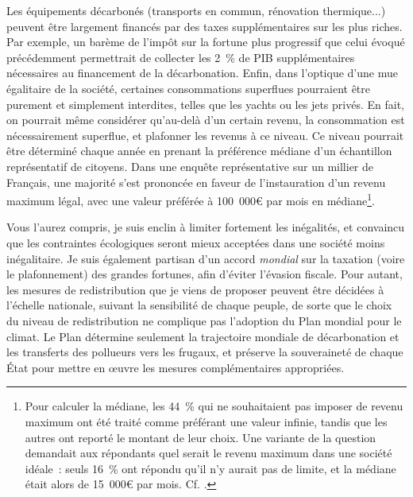 \documentclass[a5paper,french]{memoir}
\begin{document}
Les équipements décarbonés (transports en commun, rénovation thermique...) peuvent être largement financés par des taxes supplémentaires sur les plus riches. Par exemple, un barème de l'impôt sur la fortune plus progressif que celui évoqué précédemment permettrait de collecter les 2~\% de PIB supplémentaires nécessaires au financement de la décarbonation. Enfin, dans l'optique d'une mue égalitaire de la société, certaines consommations superflues pourraient être purement et simplement interdites, telles que les yachts ou les jets privés. En fait, on pourrait même considérer qu'au-delà d'un certain revenu, la consommation est nécessairement superflue, et plafonner les revenus à ce niveau. Ce niveau pourrait être déterminé chaque année en prenant la préférence médiane d'un échantillon représentatif de citoyens. Dans une enquête représentative sur un millier de Français, une majorité s'est prononcée en faveur de l'instauration d'un revenu maximum légal, avec une valeur préférée à 100~000\euro{} par mois en médiane\footnote{Pour calculer la médiane, les 44~\% qui ne souhaitaient pas imposer de revenu maximum ont été traité comme préférant une valeur infinie, tandis que les autres ont reporté le montant de leur choix. Une variante de la question demandait aux répondants quel serait le revenu maximum dans une société idéale~: seuls 16~\% ont répondu qu'il n'y aurait pas de limite, et la médiane était alors de 15~000\euro{} par mois. Cf. \cite{fabre_determiner_2022}.}. 

Vous l'aurez compris, je suis enclin à limiter fortement les inégalités, et convaincu que les contraintes écologiques seront mieux acceptées dans une société moins inégalitaire. Je suis également partisan d'un accord \textit{mondial} sur la taxation (voire le plafonnement) des grandes fortunes, afin d'éviter l'évasion fiscale. Pour autant, les mesures de redistribution que je viens de proposer peuvent être décidées à l'échelle nationale, suivant la sensibilité de chaque peuple, de sorte que le choix du niveau de redistribution ne complique pas l'adoption du Plan mondial pour le climat. Le Plan détermine seulement la trajectoire mondiale de décarbonation et les transferts des pollueurs vers les frugaux, et préserve la souveraineté de chaque État pour mettre en œuvre les mesures complémentaires appropriées.
\end{document}
